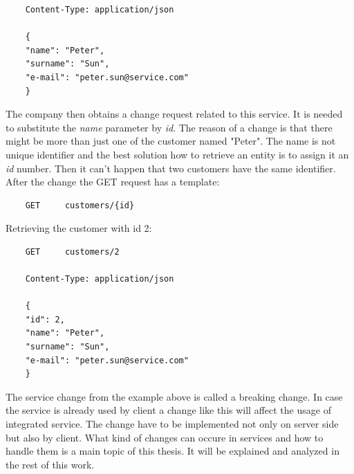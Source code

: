 \begin{lstlisting}
    Content-Type: application/json
    
    { 
    "name": "Peter",
    "surname": "Sun",
    "e-mail": "peter.sun@service.com" 
    }
\end{lstlisting}

The company then obtains a change request related to this service. It is needed to substitute the \emph{name} parameter by \emph{id}. The reason of a change is that there might be more than just one of the customer named "Peter". The name is not unique identifier and the best solution how to retrieve an entity is to assign it an \emph{id} number. Then it can't happen that two customers have the same identifier. After the change the GET request has a template:
\begin{lstlisting}
    GET     customers/{id} 
\end{lstlisting}

Retrieving the customer with id 2:

\begin{lstlisting}
    GET     customers/2 
    
    Content-Type: application/json
    
    { 
    "id": 2,
    "name": "Peter",
    "surname": "Sun",
    "e-mail": "peter.sun@service.com" 
    }
\end{lstlisting}


The service change from the example above is called a breaking change. In case the service is already used by client a change like this will affect the usage of integrated service. The change have to be implemented not only on server side but also by client. What kind of changes can occure in services and how to handle them is a main topic of this thesis. It will be explained and analyzed in the rest of this work.



